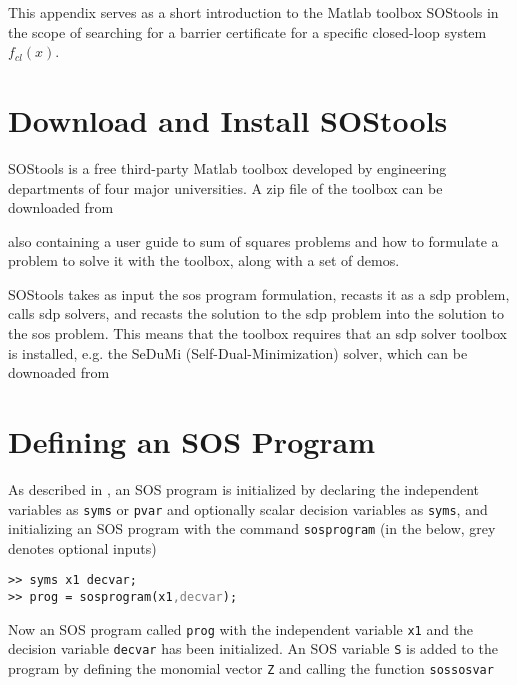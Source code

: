 This appendix serves as a short introduction to the Matlab toolbox SOStools in the scope of searching for a barrier certificate for a specific closed-loop system $f_{cl}(x)$.

\section{Download and Install SOStools}
SOStools is a free third-party Matlab toolbox developed by engineering departments of four major universities. A zip file of the toolbox can be downloaded from 

\hspace{1cm} {}

also containing a user guide \citep{bib:sostools_manual} to sum of squares problems and how to formulate a problem to solve it with the toolbox, along with a set of demos. 

SOStools takes as input the \gls{sos} program formulation, recasts it as a \gls{sdp} problem, calls \gls{sdp} solvers, and recasts the solution to the \gls{sdp} problem into the solution to the \gls{sos} problem. This means that the toolbox requires that an \gls{sdp} solver toolbox is installed, e.g. the SeDuMi (Self-Dual-Minimization) solver, which can be downoaded from

\hspace{1cm} {}

\section{Defining an SOS Program}
As described in \citep{bib:sostools_manual}, an SOS program is initialized by declaring the independent variables as \texttt{syms} or \texttt{pvar} and optionally scalar decision variables as \texttt{syms}, and initializing an SOS program with the command \texttt{sosprogram} (in the below, grey denotes optional inputs)

\hspace*{1cm} \texttt{>> syms x1 decvar;}\\
\hspace*{1cm} \texttt{>> prog = sosprogram(x1\textcolor{grey}{,decvar});}

Now an SOS program called \texttt{prog} with the independent variable \texttt{x1} and the decision variable \texttt{decvar} has been initialized. An SOS variable \texttt{S} is added to the program by defining the monomial vector \texttt{Z} and calling the function \texttt{sossosvar}

